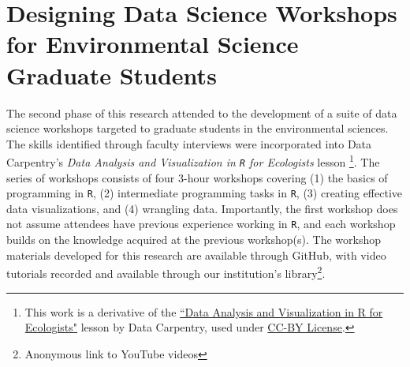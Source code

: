 \documentclass[12pt]{article}
\begin{document}

\section{Designing Data Science Workshops for Environmental Science Graduate
Students}
\label{sec:workshops}

\noindent The second phase of this research attended to the  development of a 
suite of data science workshops targeted to graduate students in the 
environmental sciences. The skills identified through faculty interviews were
incorporated into Data Carpentry's \emph{Data Analysis and Visualization in 
\texttt{R} for Ecologists} lesson \citep{ecology_curriculum}\footnote{This
work is a derivative of the \href{https://datacarpentry.org/R-ecology-lesson}{``Data 
Analysis and Visualization in R for Ecologists"} lesson by Data Carpentry, used
under \href{https://creativecommons.org/licenses/by/4.0/}{CC-BY License}.}.
The series of workshops consists of four 3-hour workshops covering (1)
the basics of programming in \texttt{R}, (2) intermediate programming tasks in 
\texttt{R}, (3) creating effective data visualizations, and (4) wrangling data.
Importantly, the first workshop does not assume attendees have previous
experience working in \texttt{R}, and each workshop builds on the knowledge
acquired at the previous workshop(s). The workshop materials developed for this
research are available through GitHub, with video tutorials recorded and
available through our institution's library\footnote{Anonymous link to YouTube
videos}.

\end{document}
